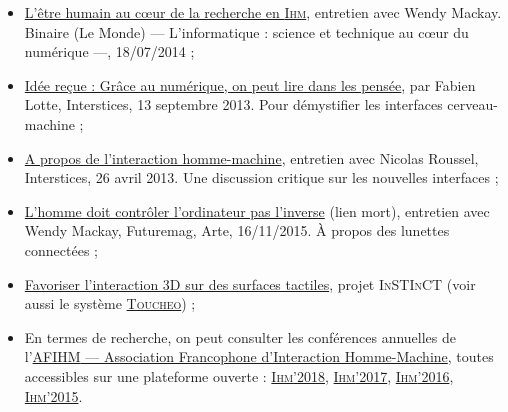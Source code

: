 
\begin{gofurther}[after skip=2pt]
\textsc{}
\smallskip
\begin{itemize}\jazzitem
\item \href{https://www.lemonde.fr/blog/binaire/2014/07/18/lihm-entretien-avec-wendy-mackay/}{L’être humain au cœur de la recherche en \textsc{Ihm}}, entretien avec Wendy Mackay. Binaire (Le Monde) --- L'informatique : science et technique au cœur du numérique ---, 18/07/2014 ;
\item \href{https://interstices.info/idee-recue-grace-au-numerique-on-peut-lire-dans-les-pensees/}{Idée reçue : Grâce au numérique, on peut lire dans les pensée}, par Fabien Lotte, Interstices, 13 septembre 2013.  Pour démystifier les interfaces cerveau-machine ;
\item \href{https://interstices.info/a-propos-de-linteraction-homme-machine/}{A propos de l'interaction homme-machine}, entretien avec Nicolas Roussel, Interstices, 26 avril 2013. Une discussion critique sur les nouvelles interfaces ;
\item \href{http://sites.arte.tv/futuremag/fr/lhomme-doit-controler-lordinateur-pas-linverse-wendy-mackay-futuremag}{L'homme doit contrôler l'ordinateur pas l'inverse} (lien mort), entretien avec Wendy Mackay, Futuremag, Arte, 16/11/2015. À propos des lunettes connectées ;
\item \href{http://project-instinct.cap-sciences.net/}{Favoriser l'interaction 3D sur des surfaces tactiles}, projet \textsc{InSTInCT} (voir aussi le système \href{https://interstices.info/quand-la-realite-virtuelle-rencontre-les-surfaces-tactiles/}{\textsc{Toucheo}}) ;
\item En termes de recherche, on peut consulter les conférences annuelles de l'\href{}{\textsc{AFIHM} --- Association Francophone d'Interaction Homme-Machine}, toutes accessibles sur une plateforme ouverte : \href{https://ihm2018.afihm.org/}{\textsc{Ihm}'2018}, \href{https://ihm2017.afihm.org/}{\textsc{Ihm}'2017}, \href{https://ihm2016.afihm.org/#!/}{\textsc{Ihm}'2016}, \href{https://hal.archives-ouvertes.fr/IHM-2015/page/actes}{\textsc{Ihm}'2015}.
\end{itemize}
\end{gofurther}%
%



